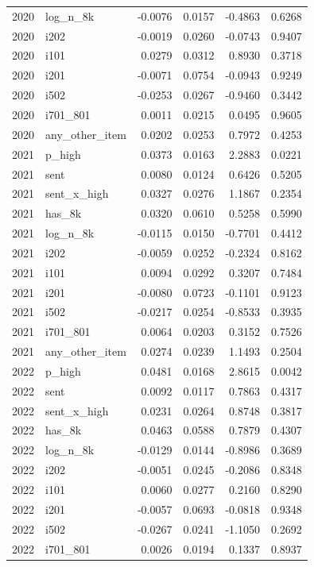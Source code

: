 \begin{tabular}{rlrrrr}
2020 & log\_n\_8k & -0.0076 & 0.0157 & -0.4863 & 0.6268 \\
2020 & i202 & -0.0019 & 0.0260 & -0.0743 & 0.9407 \\
2020 & i101 & 0.0279 & 0.0312 & 0.8930 & 0.3718 \\
2020 & i201 & -0.0071 & 0.0754 & -0.0943 & 0.9249 \\
2020 & i502 & -0.0253 & 0.0267 & -0.9460 & 0.3442 \\
2020 & i701\_801 & 0.0011 & 0.0215 & 0.0495 & 0.9605 \\
2020 & any\_other\_item & 0.0202 & 0.0253 & 0.7972 & 0.4253 \\
2021 & p\_high & 0.0373 & 0.0163 & 2.2883 & 0.0221 \\
2021 & sent & 0.0080 & 0.0124 & 0.6426 & 0.5205 \\
2021 & sent\_x\_high & 0.0327 & 0.0276 & 1.1867 & 0.2354 \\
2021 & has\_8k & 0.0320 & 0.0610 & 0.5258 & 0.5990 \\
2021 & log\_n\_8k & -0.0115 & 0.0150 & -0.7701 & 0.4412 \\
2021 & i202 & -0.0059 & 0.0252 & -0.2324 & 0.8162 \\
2021 & i101 & 0.0094 & 0.0292 & 0.3207 & 0.7484 \\
2021 & i201 & -0.0080 & 0.0723 & -0.1101 & 0.9123 \\
2021 & i502 & -0.0217 & 0.0254 & -0.8533 & 0.3935 \\
2021 & i701\_801 & 0.0064 & 0.0203 & 0.3152 & 0.7526 \\
2021 & any\_other\_item & 0.0274 & 0.0239 & 1.1493 & 0.2504 \\
2022 & p\_high & 0.0481 & 0.0168 & 2.8615 & 0.0042 \\
2022 & sent & 0.0092 & 0.0117 & 0.7863 & 0.4317 \\
2022 & sent\_x\_high & 0.0231 & 0.0264 & 0.8748 & 0.3817 \\
2022 & has\_8k & 0.0463 & 0.0588 & 0.7879 & 0.4307 \\
2022 & log\_n\_8k & -0.0129 & 0.0144 & -0.8986 & 0.3689 \\
2022 & i202 & -0.0051 & 0.0245 & -0.2086 & 0.8348 \\
2022 & i101 & 0.0060 & 0.0277 & 0.2160 & 0.8290 \\
2022 & i201 & -0.0057 & 0.0693 & -0.0818 & 0.9348 \\
2022 & i502 & -0.0267 & 0.0241 & -1.1050 & 0.2692 \\
2022 & i701\_801 & 0.0026 & 0.0194 & 0.1337 & 0.8937 \\

\end{tabular}
